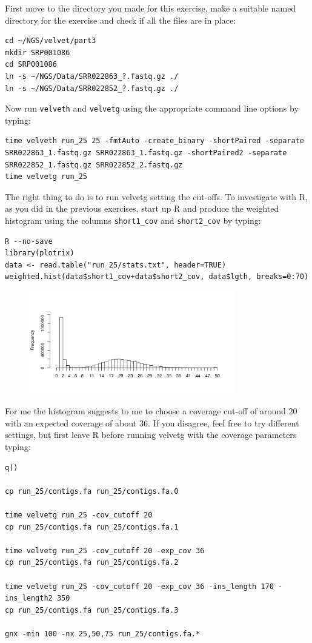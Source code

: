 \begin{steps}
First move to the directory you made for this exercise, make a suitable named
directory for the exercise and check if all the files are in place:
\begin{lstlisting}
cd ~/NGS/velvet/part3
mkdir SRP001086
cd SRP001086
ln -s ~/NGS/Data/SRR022863_?.fastq.gz ./
ln -s ~/NGS/Data/SRR022852_?.fastq.gz ./
\end{lstlisting}

Now run \texttt{velveth} and \texttt{velvetg} using the appropriate command line
options by typing:
\begin{lstlisting}
time velveth run_25 25 -fmtAuto -create_binary -shortPaired -separate SRR022863_1.fastq.gz SRR022863_1.fastq.gz -shortPaired2 -separate SRR022852_1.fastq.gz SRR022852_2.fastq.gz
time velvetg run_25
\end{lstlisting}

The right thing to do is to run velvetg setting the cut-offs. To investigate
with R, as you did in the previous exercises, start up R and produce the
weighted histogram using the columns \texttt{short1\_cov} and
\texttt{short2\_cov} by typing:
\begin{lstlisting}
R --no-save
library(plotrix) 
data <- read.table("run_25/stats.txt", header=TRUE) 
weighted.hist(data$short1_cov+data$short2_cov, data$lgth, breaks=0:70)
\end{lstlisting}

\begin{figure}[H]
\centering
\includegraphics[width=0.8\textwidth]{de_novo/velvet_Rplot003.png}
\label{fig:velvet_Rplot003}
\end{figure}

For me the histogram suggests to me to choose a coverage cut-off of around 20
with an expected coverage of about 36. If you disagree, feel free to try
different settings, but first leave R before running velvetg with the coverage
parameters typing:
\begin{lstlisting}
q()

cp run_25/contigs.fa run_25/contigs.fa.0

time velvetg run_25 -cov_cutoff 20 
cp run_25/contigs.fa run_25/contigs.fa.1

time velvetg run_25 -cov_cutoff 20 -exp_cov 36 
cp run_25/contigs.fa run_25/contigs.fa.2

time velvetg run_25 -cov_cutoff 20 -exp_cov 36 -ins_length 170 -ins_length2 350
cp run_25/contigs.fa run_25/contigs.fa.3

gnx -min 100 -nx 25,50,75 run_25/contigs.fa.*
\end{lstlisting}

\end{steps}

